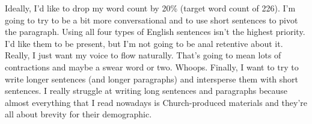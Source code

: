 Ideally, I'd like to drop my word count by 20\% (target word count of 226). I'm going to try to be a bit more conversational and to use short sentences to pivot the paragraph. Using all four types of English sentences isn't the highest priority. I'd like them to be present, but I'm not going to be anal retentive about it. Really, I just want my voice to flow naturally. That's going to mean lots of contractions and maybe a swear word or two. Whoops. Finally, I want to try to write longer sentences (and longer paragraphs) and intersperse them with short sentences. I really struggle at writing long sentences and paragraphs because almost everything that I read nowadays is Church-produced materials and they're all about brevity for their demographic.

